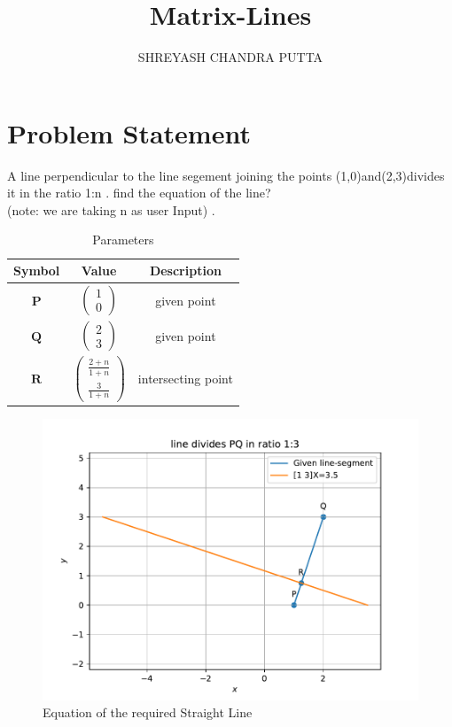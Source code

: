 \documentclass[journal,12pt,twocolumn]{article}
\title{
Matrix-Lines
}
\author{SHREYASH CHANDRA PUTTA}
\newcommand{\myvec}[1]{\ensuremath{\begin{pmatrix}#1\end{pmatrix}}}
\let\vec\mathbf
\begin{document}
\maketitle
\tableofcontents

\section{Problem Statement}
A line perpendicular to the line segement joining the points (1,0)and(2,3)divides it in the ratio 1:n . find the equation of the line?\\
(note: we are taking n as user Input) .

% 

\begin{table}[h]
    \centering
    \begin{tabular}{|c|c|c|}
       \hline
       \textbf{Symbol}&\textbf{Value}&\textbf{Description}  \\
       \hline
	    $\vec{P}$ & $\myvec{
		    1\\
		    0}$
	    & given point\\
        \hline
	    $\vec{Q}$ & $\myvec{2\\3}$
 & given point\\
        \hline
	    $\vec{R}$ & $\myvec{
  \frac{2+n}{1+n}\\
  \frac{3}{1+n}}$
 & intersecting point  \\
       \hline
    \end{tabular}
    \caption{Parameters}
    \label{tab:my_label}
\end{table}


\begin{figure}[h]
    \centering
\includegraphics[width=\columnwidth]{fig/linefig.pdf}
    \caption{Equation of the required Straight Line}
    \label{fig:my_label}
\end{figure}
\end{document}
